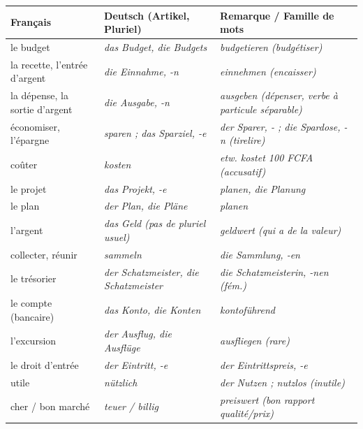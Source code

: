 \documentclass[11pt]{article}
\newcommand{\all}[1]{\ifmmode\text{\textit{#1}}\else\begingroup\selectlanguage{ngerman}\itshape #1\endgroup\fi}
\begin{document}
\begin{definition}
\begin{center}
\begin{tabularx}{\linewidth}{|X|X|X|}
\hline
\rowcolor{popblueL} \textbf{Français} & \textbf{Deutsch (Artikel, Pluriel)} & \textbf{Remarque / Famille de mots} \\
\hline
le budget & \all{das Budget, die Budgets} & \all{budgetieren} (budgétiser) \\
la recette, l'entrée d'argent & \all{die Einnahme, -n} & \all{einnehmen} (encaisser) \\
la dépense, la sortie d'argent & \all{die Ausgabe, -n} & \all{ausgeben} (dépenser, verbe à particule séparable) \\
économiser, l'épargne & \all{sparen} ; \all{das Sparziel, -e} & \all{der Sparer, -} ; \all{die Spardose, -n} (tirelire) \\
coûter & \all{kosten} & \all{etw. kostet 100 FCFA} (accusatif) \\
le projet & \all{das Projekt, -e} & \all{planen, die Planung} \\
le plan & \all{der Plan, die Pläne} & \all{planen} \\
l'argent & \all{das Geld} (pas de pluriel usuel) & \all{geldwert} (qui a de la valeur) \\
collecter, réunir & \all{sammeln} & \all{die Sammlung, -en} \\
le trésorier & \all{der Schatzmeister, die Schatzmeister} & \all{die Schatzmeisterin, -nen} (fém.) \\
le compte (bancaire) & \all{das Konto, die Konten} & \all{kontoführend} \\
l'excursion & \all{der Ausflug, die Ausflüge} & \all{ausfliegen} (rare) \\
le droit d'entrée & \all{der Eintritt, -e} & \all{der Eintrittspreis, -e} \\
utile & \all{nützlich} & \all{der Nutzen} ; \all{nutzlos} (inutile) \\
cher / bon marché & \all{teuer / billig} & \all{preiswert} (bon rapport qualité/prix) \\
\hline
\end{tabularx}
\end{center}
\end{definition}
\end{document}
